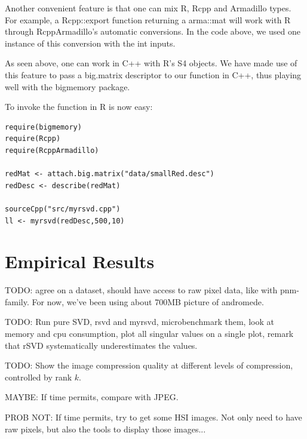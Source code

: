 \documentclass[a4paper,11pt]{amsart}
\begin{document}
Another convenient feature is that one can mix R, Rcpp and Armadillo types. For example, a Rcpp::export function returning a arma::mat will work with R through RcppArmadillo's automatic conversions. In the code above, we used one instance of this conversion with the int inputs. 

As seen above, one can work in C++ with R's S4 objects. We have made use of this feature to pass a big.matrix descriptor to our function in C++, thus playing well with the bigmemory package. 

To invoke the function in R is now easy:
\begin{verbatim}
require(bigmemory)
require(Rcpp)
require(RcppArmadillo)

redMat <- attach.big.matrix("data/smallRed.desc")
redDesc <- describe(redMat)

sourceCpp("src/myrsvd.cpp")
ll <- myrsvd(redDesc,500,10)
\end{verbatim}

\section{Empirical Results}
TODO: agree on a dataset, should have access to raw pixel data, like with pnm-family. For now, we've been using about 700MB picture of andromede.

TODO: Run pure SVD, rsvd and myrsvd, microbenchmark them, look at memory and cpu consumption, plot all singular values on a single plot, remark that rSVD systematically underestimates the values. 

TODO: Show the image compression quality at different levels of compression, controlled by rank $k$.

MAYBE: If time permits, compare with JPEG.

PROB NOT: If time permits, try to get some HSI images. Not only need to have raw pixels, but also the tools to display those images...


\end{document}
